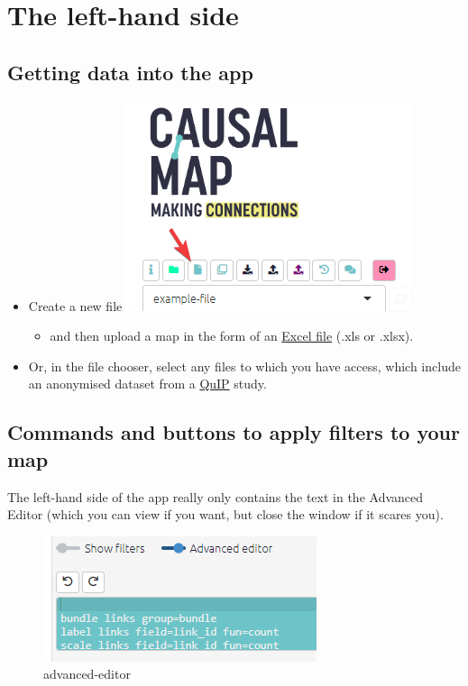 \documentclass[
]{book}
\providecommand{\tightlist}{%
  \setlength{\itemsep}{0pt}\setlength{\parskip}{0pt}}
\begin{document}
\hypertarget{xlhs}{%
\section{The left-hand side}\label{xlhs}}

\hypertarget{getting-data-into-the-app}{%
\subsection{Getting data into the app}\label{getting-data-into-the-app}}

\begin{itemize}
\tightlist
\item
  Create a new file \includegraphics{_assets/image-20220723134329170.png}

  \begin{itemize}
  \tightlist
  \item
    and then upload a map in the form of an \protect\hyperlink{xuploading-and-updating}{Excel file} (.xls or .xlsx).
  \end{itemize}
\item
  Or, in the file chooser, select any files to which you have access, which include an anonymised dataset from a \href{http://bathsdr.org/}{QuIP} study.
\end{itemize}

\hypertarget{commands-and-buttons-to-apply-filters-to-your-map}{%
\subsection{Commands and buttons to apply filters to your map}\label{commands-and-buttons-to-apply-filters-to-your-map}}

The left-hand side of the app really only contains the text in the Advanced Editor (which you can view if you want, but close the window if it scares you).

\begin{figure}
\centering
\includegraphics{_assets/image-20210914103354673.png}
\caption{advanced-editor}
\end{figure}
\end{document}
